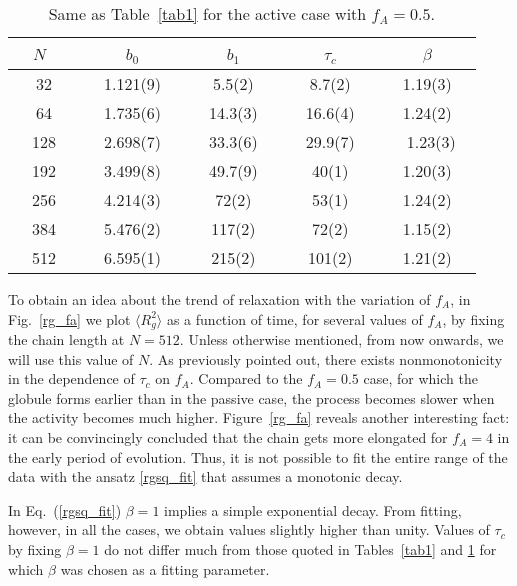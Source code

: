 \documentclass[aps,prx,reprint,showpacs,showkeys,noeprint,longbibliography]{revtex4-1} %
\begin{document}
\begin{table}[t!]
	\caption{Same as Table~\ref{tab1} for the active case with $f_A=0.5$.}\label{tab2}
\centering
\begin{tabular}{|c|c|c|c|c|}
\hline
~$N$~~&~~$b_0$~~&~~$b_1$~~&~~$\tau_c$~~&~~$\beta$~~\\
\hline
~~32~~&~~1.121(9)~~&~~5.5(2)~~&~~8.7(2)~~&~~1.19(3)~~\\
~~64~~&~~1.735(6)~~&~~14.3(3)~~&~~16.6(4)~~&~~1.24(2)~~\\
~~128~~&~~2.698(7)~~&~~33.3(6)~~&~~29.9(7)~~&~1.23(3)\\
~~192~~&~~3.499(8)~~&~~49.7(9)~~&~~40(1)~~&~~1.20(3)~~\\
~~256~~&~~4.214(3)~~&~~72(2)~~&~~53(1)~~&~~1.24(2)~~\\
~~384~~&~~5.476(2)~~&~~117(2)~~&~~72(2)~~&~~1.15(2)~~\\
~~512~~&~~6.595(1)~~&~~215(2)~~&~~101(2)~~&~~1.21(2)~~\\
\hline
\end{tabular}
\end{table}
\par 
To obtain an idea about the trend of relaxation with the variation of $f_A$, in Fig.~\ref{rg_fa} we plot $ \langle R_g^2 \rangle$ as a function of time, for several values of $f_A$, by fixing the chain length at $N=512$. Unless otherwise mentioned, from now onwards, we will use  this value of $N$. As previously pointed out, there exists nonmonotonicity  in the dependence of $\tau_c$ on $f_A$. Compared to the $f_A=0.5$ case, for which the globule forms earlier than in the passive case, the process becomes slower when the activity becomes much higher. Figure~\ref{rg_fa} reveals another interesting fact: it can be convincingly concluded that the chain gets more elongated for $f_A=4$ in the early period of evolution. Thus, it is not possible to fit the entire range of the data with the ansatz \eqref{rgsq_fit} that assumes a monotonic decay.
\par 
In Eq.~(\ref{rgsq_fit}) $\beta=1$ implies a simple exponential decay. From fitting, however, in all the cases, we obtain values slightly higher than unity. Values of $\tau_c$ by fixing $\beta=1$ do not differ much from those quoted in Tables~\ref{tab1} and \ref{tab2} for which $\beta$ was chosen as a fitting parameter.
\end{document}
